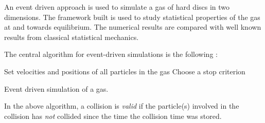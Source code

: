 An event driven approach is used to simulate a gas of hard discs in two dimensions. The framework built is used to study statistical properties of the gas at and towards equilibrium. The numerical results are compared with well known results from classical statistical mechanics. 

The central algorithm for event-driven simulations is the following \cite{event_sim}:

\begin{algorithm}[H]
	Set velocities and positions of all particles in the gas\;
	Choose a stop criterion \;
	\caption{Event driven simulation of a gas.}
\end{algorithm}

In the above algorithm, a collision is \textit{valid} if the particle(s) involved in the collision has \textit{not} collided since the time the collision time was stored. 
